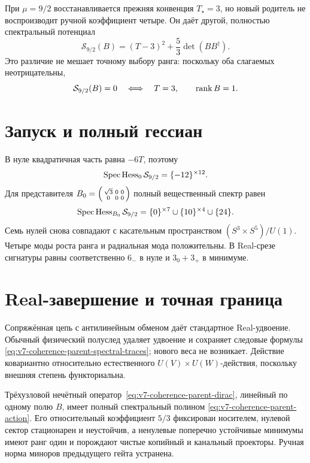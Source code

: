 При $\mu=9/2$ восстанавливается прежняя конвенция $T_\star=3$, но новый
родитель не воспроизводит ручной коэффициент четыре. Он даёт другой,
полностью спектральный потенциал
\begin{equation}
 \mathcal S_{9/2}(B)=(T-3)^2+\frac53\det(BB^\dagger).
 \label{eq:v7-coherence-parent-normalized-action}
\end{equation}
Это различие не мешает точному выбору ранга: поскольку оба слагаемых
неотрицательны,
\begin{equation}
 \mathcal S_{9/2}(B)=0
 \quad\Longleftrightarrow\quad
 T=3,\qquad\operatorname{rank} B=1.
 \label{eq:v7-coherence-parent-zero-set}
\end{equation}

\section{Запуск и полный гессиан}

В нуле квадратичная часть равна $-6T$, поэтому
\begin{equation}
 \operatorname{Spec}\operatorname{Hess}_0\mathcal S_{9/2}
 =\{-12\}^{\times12}.
 \label{eq:v7-coherence-parent-origin-hessian}
\end{equation}
Для представителя
$B_0=\begin{psmallmatrix}\sqrt3&0&0\\0&0&0\end{psmallmatrix}$
полный вещественный спектр равен
\begin{equation}
 \operatorname{Spec}\operatorname{Hess}_{B_0}\mathcal S_{9/2}
 =\{0\}^{\times7}
 \cup\{10\}^{\times4}
 \cup\{24\}.
 \label{eq:v7-coherence-parent-vacuum-hessian}
\end{equation}
Семь нулей снова совпадают с касательным пространством
$(S^3\times S^5)/U(1)$. Четыре моды роста ранга и радиальная мода
положительны. В Real-срезе сигнатуры равны соответственно
$6_-$ в нуле и $3_0+3_+$ в минимуме.

\section{Real-завершение и точная граница}

Сопряжённая цепь с антилинейным обменом даёт стандартное Real-удвоение.
Обычный физический полуслед удаляет удвоение и сохраняет следовые формулы
\eqref{eq:v7-coherence-parent-spectral-traces}; нового веса не возникает.
Действие ковариантно относительно естественного
$U(V)\times U(W)$-действия, поскольку внешняя степень функториальна.

\begin{theorem}
Трёхузловой нечётный оператор~\eqref{eq:v7-coherence-parent-dirac},
линейный по одному полю $B$, имеет полный спектральный полином
\eqref{eq:v7-coherence-parent-action}. Его относительный коэффициент
$5/3$ фиксирован носителем, нулевой сектор стационарен и неустойчив, а
ненулевые поперечно устойчивые минимумы имеют ранг один и порождают чистые
копийный и канальный проекторы. Ручная норма миноров предыдущего гейта
устранена.
\end{theorem}

